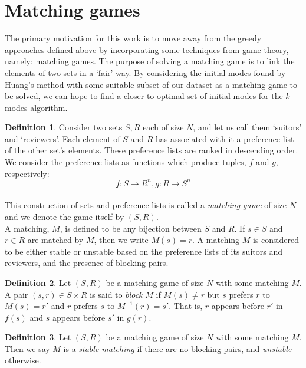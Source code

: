 \documentclass{article}
\theoremstyle{definition}
\newtheorem{definition}{Definition}[section]
\begin{document}
\section{Matching games}\label{section:matching}

The primary motivation for this work is to move away from the greedy approaches
defined above by incorporating some techniques from game theory, namely:
matching games. The purpose of solving a matching game is to link the elements
of two sets in a `fair' way. By considering the initial modes found by Huang's 
method with some suitable subset of our dataset as a matching game to be solved, 
we can hope to find a closer-to-optimal set of initial modes for the \(k\)-modes 
algorithm.


\begin{definition}\label{def:matching-game}
    Consider two sets \(S, R\) each of size \(N\), and let us call them 
    `suitors' and `reviewers'. Each element of \(S\) and \(R\) has associated 
    with it a preference list of the other set's elements. These preference 
    lists are ranked in descending order. We consider the preference lists as 
    functions which produce tuples, \(f\) and \(g\), respectively:
	\[
	    f : S \to R^n, g : R \to S^n
	\]\\

	This construction of sets and preference lists is called a 
    \emph{matching game} of size \(N\) and we denote the game itself by 
    \((S,R)\).\\
	
    A matching, \(M\), is defined to be any bijection between \(S\) and \(R\). 
    If \(s \in S\) and \(r \in R\) are matched by \(M\), then we write \(M(s) = 
    r\). A matching \(M\) is considered to be either stable or unstable based on
    the preference lists of its suitors and reviewers, and the presence of 
    blocking pairs.
\end{definition}

\begin{definition}\label{def:blocking-pair}
    Let \((S, R)\) be a matching game of size \(N\) with some matching \(M\). A 
    pair \((s, r) \in S \times R\) is said to \emph{block} \(M\) if \(M(s) \ne
    r\) but \(s\) prefers \(r\) to \(M(s) = r'\) and \(r\) prefers \(s\) to
    \(M^{-1}(r) = s'\). That is, \(r\) appears before \(r'\) in \(f(s)\) and
    \(s\) appears before \(s'\) in \(g(r)\).
\end{definition}

\begin{definition}\label{def:stable-matching}
    Let \((S, R)\) be a matching game of size \(N\) with some matching \(M\). 
    Then we say \(M\) is a \emph{stable matching} if there are no blocking 
    pairs, and \emph{unstable} otherwise.
\end{definition}
\end{document}
